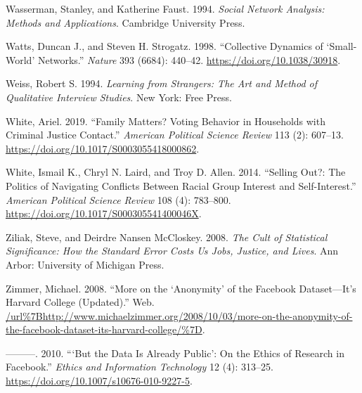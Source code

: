 \documentclass{book}
\newlength{\cslhangindent}
\newlength{\cslentryspacingunit} %
\newenvironment{CSLReferences}[2] %
 {%
  \setlength{\parindent}{0pt}
  \ifodd #1
  \let\oldpar\par
  \def\par{\hangindent=\cslhangindent\oldpar}
  \fi
  \setlength{\parskip}{#2\cslentryspacingunit}
 }%
 {}
\begin{document}
\begin{CSLReferences}{1}{0}
\leavevmode{}%
Wasserman, Stanley, and Katherine Faust. 1994. \emph{Social Network Analysis:
Methods and Applications}. Cambridge University Press.

\leavevmode{}%
Watts, Duncan J., and Steven H. Strogatz. 1998. {``Collective Dynamics of
{`Small-World'} Networks.''} \emph{Nature} 393 (6684): 440--42.
\url{https://doi.org/10.1038/30918}.

\leavevmode{}%
Weiss, Robert S. 1994. \emph{Learning from Strangers: The Art and Method of
Qualitative Interview Studies}. New York: Free Press.

\leavevmode{}%
White, Ariel. 2019. {``Family Matters? Voting Behavior in Households with
Criminal Justice Contact.''} \emph{American Political Science Review} 113 (2):
607--13. \url{https://doi.org/10.1017/S0003055418000862}.

\leavevmode{}%
White, Ismail K., Chryl N. Laird, and Troy D. Allen. 2014. {``Selling {Out}?:
{The} {Politics} of {Navigating} {Conflicts} Between {Racial} {Group}
{Interest} and {Self}-Interest.''} \emph{American Political Science Review}
108 (4): 783--800. \url{https://doi.org/10.1017/S000305541400046X}.

\leavevmode{}%
Ziliak, Steve, and Deirdre Nansen McCloskey. 2008. \emph{The Cult of
Statistical Significance: How the Standard Error Costs Us Jobs, Justice, and
Lives}. Ann Arbor: University of Michigan Press.

\leavevmode{}%
Zimmer, Michael. 2008. {``More on the {`Anonymity'} of the Facebook
Dataset---It's Harvard College (Updated).''} Web.
\url{/url\%7Bhttp://www.michaelzimmer.org/2008/10/03/more-on-the-anonymity-of-the-facebook-dataset-its-harvard-college/\%7D}.

\leavevmode{}%
---------. 2010. {``{`But the Data Is Already Public'}: On the Ethics of
Research in Facebook.''} \emph{Ethics and Information Technology} 12 (4):
313--25. \url{https://doi.org/10.1007/s10676-010-9227-5}.

\end{CSLReferences}

\backmatter
\end{document}

